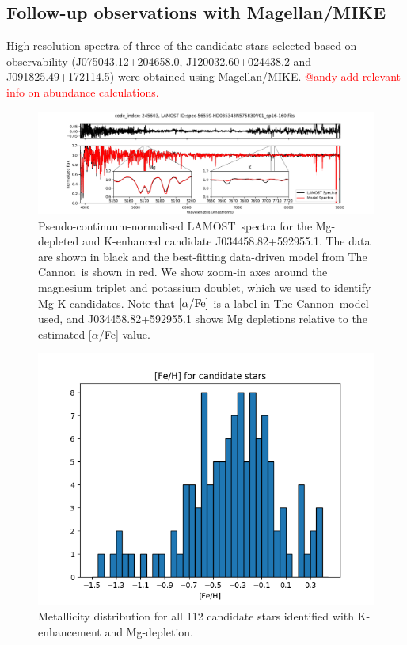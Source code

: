 \documentclass[a4paper,fleqn,usenatbib]{mnras}
\newcommand{\todo}[1]{\textcolor{red}{#1}}
\newcommand{\project}[1]{#1}
\newcommand{\lamost}{\project{LAMOST}}
\newcommand{\tc}{\project{The Cannon}}
\begin{document}


\subsection{Follow-up observations with Magellan/MIKE}
High resolution spectra of three of the candidate stars selected based on observability (J075043.12+204658.0, J120032.60+024438.2 and J091825.49+172114.5) were obtained using Magellan/MIKE. \todo{@andy add relevant info on abundance calculations.}


\begin{figure}
	\includegraphics[width=\textwidth]{posterchildof13.png}
    \caption{Pseudo-continuum-normalised \lamost\ spectra for the Mg-depleted and K-enhanced candidate J034458.82+592955.1. The data  are shown in black and the best-fitting data-driven model from \tc\ is shown in red. We show zoom-in axes around the magnesium triplet and potassium doublet, which we used to identify Mg-K candidates. Note that $[\alpha/{\rm Fe}]$ is a label in \tc\ model used, and J034458.82+592955.1 shows Mg depletions relative to the estimated [$\alpha$/Fe] value.}
    \label{posterchild}
\end{figure}

\begin{figure}
	\includegraphics[width=\columnwidth]{histof113.png}
    \caption{Metallicity distribution for all 112 candidate stars identified with K-enhancement and Mg-depletion.}
    \label{mhist}
\end{figure}
\end{document}
